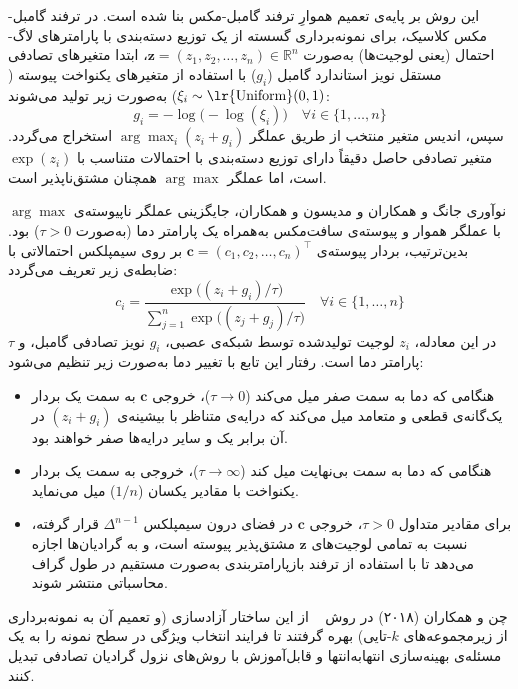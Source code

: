 این روش بر پایه‌ی تعمیم هموارِ ترفند گامبل-مکس بنا شده است. در ترفند گامبل-مکس کلاسیک، برای نمونه‌برداری گسسته از یک توزیع دسته‌بندی با پارامترهای لاگ-احتمال (یعنی لوجیت‌ها) به‌صورت $\mathbf{z} = (z_1, z_2, \dots, z_n) \in \mathbb{R}^n$، ابتدا متغیرهای تصادفی مستقل نویز استاندارد گامبل ($g_i$) با استفاده از متغیرهای یکنواخت پیوسته ($\xi_i \sim \text{\lr{Uniform}}(0, 1)$) به‌صورت زیر تولید می‌شوند:
\begin{equation}\label{eq:chap2_gumbel_noise}
    g_i = -\log\big(-\log(\xi_i)\big) \quad \forall i \in \{1, \dots, n\}
\end{equation}
سپس، اندیس متغیر منتخب از طریق عملگر $\arg\max_i (z_i + g_i)$ استخراج می‌گردد. متغیر تصادفی حاصل دقیقاً دارای توزیع دسته‌بندی با احتمالات متناسب با $\exp(z_i)$ است، اما عملگر $\arg\max$ همچنان مشتق‌ناپذیر است.

نوآوری جانگ و همکاران و مدیسون و همکاران، جایگزینی عملگر ناپیوسته‌ی $\arg\max$ با عملگر هموار و پیوسته‌ی سافت‌مکس به‌همراه یک پارامتر دما (به‌صورت $\tau > 0$) بود. بدین‌ترتیب، بردار پیوسته‌ی $\mathbf{c} = {(c_1, c_2, \dots, c_n)}^\top$ بر روی سیمپلکس احتمالاتی با ضابطه‌ی زیر تعریف می‌گردد:
\begin{equation}\label{eq:chap2_gumbel_softmax}
    c_i = \frac{\exp\big((z_i + g_i) / \tau\big)}{\sum_{j=1}^n \exp\big((z_j + g_j) / \tau\big)} \quad \forall i \in \{1, \dots, n\}
\end{equation}
در این معادله، $z_i$ لوجیت تولیدشده توسط شبکه‌ی عصبی، $g_i$ نویز تصادفی گامبل، و $\tau$ پارامتر دما است. رفتار این تابع با تغییر دما به‌صورت زیر تنظیم می‌شود:
\begin{itemize}
    \item هنگامی که دما به سمت صفر میل می‌کند ($\tau \to 0$)، خروجی $\mathbf{c}$ به سمت یک بردار یک‌گانه‌ی قطعی و متعامد میل می‌کند که درایه‌ی متناظر با بیشینه‌ی $(z_i + g_i)$ در آن برابر یک و سایر درایه‌ها صفر خواهند بود.
    \vspace{-0.15cm}
    \item هنگامی که دما به سمت بی‌نهایت میل کند ($\tau \to \infty$)، خروجی به سمت یک بردار یکنواخت با مقادیر یکسان ($1/n$) میل می‌نماید.
    \vspace{-0.15cm}
    \item برای مقادیر متداول $\tau > 0$، خروجی $\mathbf{c}$ در فضای درون سیمپلکس $\Delta^{n-1}$ قرار گرفته، نسبت به تمامی لوجیت‌های $\mathbf{z}$ مشتق‌پذیر پیوسته است، و به گرادیان‌ها اجازه می‌دهد تا با استفاده از ترفند بازپارامتربندی به‌صورت مستقیم در طول گراف محاسباتی منتشر شوند.
\end{itemize}

چن و همکاران (۲۰۱۸) در روش ~\cite{chen2018learning} از این ساختار آزادسازی (و تعمیم آن به نمونه‌برداری از زیرمجموعه‌های $k$-تایی) بهره گرفتند تا فرایند انتخاب ویژگی در سطح نمونه را به یک مسئله‌ی بهینه‌سازی انتها‌به‌انتها و قابل‌آموزش با روش‌های نزول گرادیان تصادفی تبدیل کنند.
